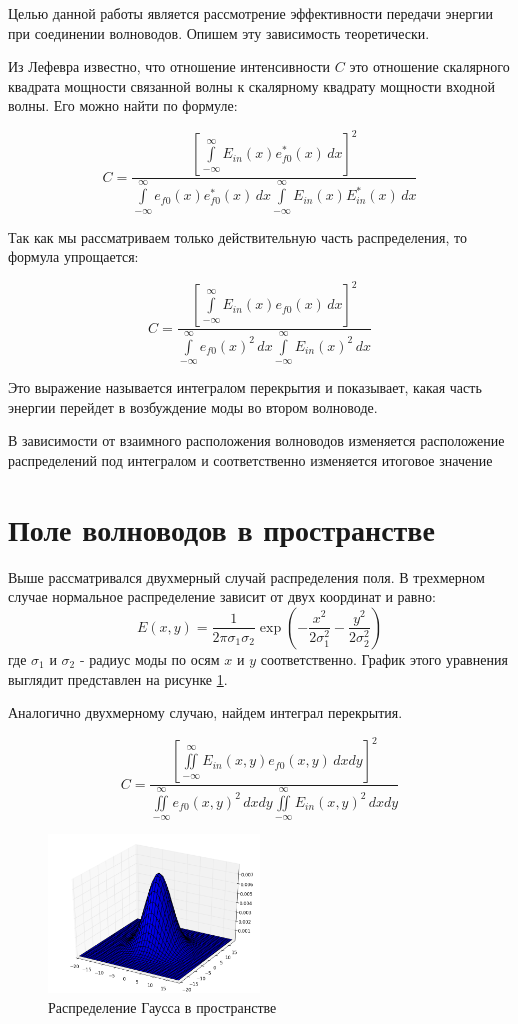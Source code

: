 Целью данной работы является рассмотрение эффективности передачи энергии при соединении волноводов. Опишем эту зависимость теоретически.

Из Лефевра известно, что отношение интенсивности $C$ это отношение скалярного квадрата мощности связанной волны к скалярному квадрату мощности входной волны. Его можно найти по формуле:

\begin{equation}
	\label{coupling_full}
	C = \frac{\left[\int\limits_{-\infty}^{\infty}E_{in}(x)e_{f0}^*(x) \,dx\right]^2}
	{\int\limits_{-\infty}^{\infty}e_{f0}(x)e_{f0}^*(x) \,dx
	 \int\limits_{-\infty}^{\infty}E_{in}(x)E_{in}^*(x) \,dx}
\end{equation}

Так как мы рассматриваем только действительную часть распределения, то формула упрощается:

\begin{equation}
	\label{coupling}
	C = \frac{\left[\int\limits_{-\infty}^{\infty}E_{in}(x)e_{f0}(x) \,dx\right]^2}
	{\int\limits_{-\infty}^{\infty}e_{f0}(x)^2 \,dx
	 \int\limits_{-\infty}^{\infty}E_{in}(x)^2 \,dx}
\end{equation}

Это выражение называется интегралом перекрытия  и показывает, какая часть энергии перейдет в возбуждение моды во втором волноводе. 

В зависимости от взаимного расположения волноводов изменяется расположение распределений под интегралом и соответственно изменяется итоговое значение

\section{Поле волноводов в пространстве}

Выше рассматривался двухмерный случай распределения поля. В трехмерном случае нормальное распределение зависит от двух координат и равно:
\begin{equation}
  \label{gauss3d}
  E(x,y)=\frac{1}{2\pi\sigma_1\sigma_2}\exp\left(-\frac{x^2}{2\sigma_1^2}-\frac{y^2}{2\sigma_2^2}\right)
\end{equation}
где $\sigma_1$ и $\sigma_2$ - радиус моды по осям $x$ и $y$ соответственно. График этого уравнения выглядит представлен на рисунке \ref{gauss3dPlot}.

Аналогично двухмерному случаю, найдем интеграл перекрытия.

\begin{equation}
	\label{coupling}
	C = \frac{\left[\iint\limits_{-\infty}^{\infty}E_{in}(x,y)e_{f0}(x,y) \,dxdy\right]^2}
	{\iint\limits_{-\infty}^{\infty}e_{f0}(x,y)^2 \,dxdy
	 \iint\limits_{-\infty}^{\infty}E_{in}(x,y)^2 \,dxdy}
\end{equation}

\begin{figure}[h!]
	\includegraphics[width=0.5\textwidth]{img/gauss3d.png}
	\caption{Распределение Гаусса в пространстве}
	\label{gauss3dPlot}
\end{figure}

